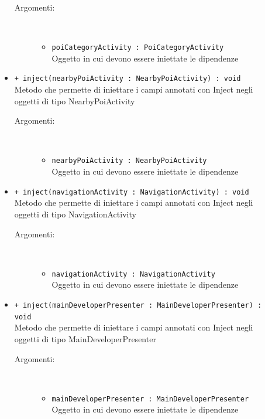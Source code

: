 \documentclass[../DefinizioneDiProdotto.tex]{subfiles}
\begin{document}
\begin{description}
\begin{itemize}
\begin{description}
			\item[Argomenti:] \
			\begin{itemize}
				\item \texttt{poiCategoryActivity : PoiCategoryActivity}\\
				Oggetto in cui devono essere iniettate le dipendenze\end{itemize}
		\end{description}
		\item \texttt{+ inject(nearbyPoiActivity : NearbyPoiActivity) : void}\\
		Metodo che permette di iniettare i campi annotati con Inject negli oggetti di tipo NearbyPoiActivity
		\begin{description}
			\item[Argomenti:] \
			\begin{itemize}
				\item \texttt{nearbyPoiActivity : NearbyPoiActivity}\\
				Oggetto in cui devono essere iniettate le dipendenze\end{itemize}
		\end{description}
		\item \texttt{+ inject(navigationActivity : NavigationActivity) : void}\\
		Metodo che permette di iniettare i campi annotati con Inject negli oggetti di tipo NavigationActivity
		\begin{description}
			\item[Argomenti:] \
			\begin{itemize}
				\item \texttt{navigationActivity : NavigationActivity}\\
				Oggetto in cui devono essere iniettate le dipendenze\end{itemize}
		\end{description}
		\item \texttt{+ inject(mainDeveloperPresenter : MainDeveloperPresenter) : void}\\
		Metodo che permette di iniettare i campi annotati con Inject negli oggetti di tipo MainDeveloperPresenter
		\begin{description}
			\item[Argomenti:] \
			\begin{itemize}
				\item \texttt{mainDeveloperPresenter : MainDeveloperPresenter}\\
				Oggetto in cui devono essere iniettate le dipendenze\end{itemize}

\end{description}
\end{itemize}
\end{description}
\end{document}
